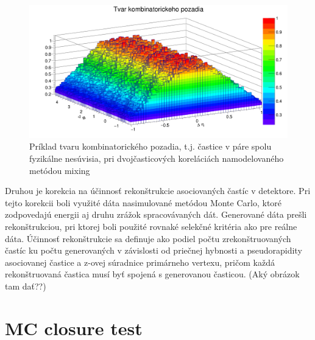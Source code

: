 \documentclass[thesismargins, thesislinespacing]{rnthesis}
\begin{document}
\begin{figure}[hbtp!]
	\centering
	\includegraphics[scale=0.2]{./Obrazky_praca/pozadie.png}
	\caption{Príklad tvaru kombinatorického pozadia, t.j. častice v páre spolu fyzikálne nesúvisia, pri dvojčasticových koreláciách namodelovaného metódou mixing}
	\label{pozadie}
\end{figure}

Druhou je korekcia na účinnosť rekonštrukcie asociovaných častíc v detektore. Pri tejto korekcii boli využité dáta nasimulované metódou Monte Carlo, ktoré zodpovedajú energii aj druhu zrážok spracovávaných dát. Generované dáta prešli \-re\-kon\-štruk\-ciou, pri ktorej boli použité rovnaké selekčné kritéria ako pre reálne dáta. Účinnosť re\-kon\-štruk\-cie sa definuje ako podiel počtu zrekonštruovaných častíc ku počtu generovaných v závislosti od priečnej hybnosti a  pseudorapidity asociovanej častice a z-ovej súradnice primárneho vertexu, pričom každá rekonštruovaná častica musí byť spojená s generovanou časticou.  (Aký obrázok tam dať??)


\section{MC closure test}
\end{document}
